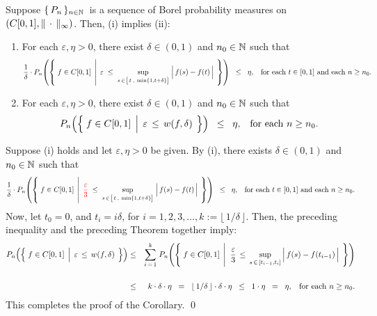 \begin{corollary}
\mbox{}\vskip 0.2cm
\noindent
Suppose $\{\,P_{n}\,\}_{n\in\mathbb{N}}$\, is a sequence of Borel probability measures on $\left(C[0,1],\Vert\,\cdot\,\Vert_{\infty}\right)$.
\vskip 0.1cm
\noindent
Then, (i) implies (ii):
\begin{enumerate}
\item	For each $\varepsilon, \eta > 0$, there exist $\delta \in (0,1)$ and $n_{0} \in \mathbb{N}$ such that
		\begin{equation*}
		\dfrac{1}{\delta}\cdot
		P_{n}\!\left(\left\{\;
			f \in \Czo
			\;\left\vert\;\,
				\varepsilon\;\leq\;\underset{s\,\in\,\left[\,t\,\overset{{\color{white}1}}{,}\,\min\{1,t+\delta\}\right]}{\sup}
				\,\left\vert\,f(s) \overset{{\color{white}.}}{-} f(t)\,\right\vert
			\right.
		\;\right\}\right)
		\;\;\leq\;\; \eta,
		\;\;\;
		\textnormal{for each $t \in [0,1]$ and each $n \geq n_{0}$}.
		\end{equation*}
\item	For each $\varepsilon, \eta > 0$, there exist $\delta \in (0,1)$ and $n_{0} \in \mathbb{N}$ such that
		\begin{equation*}
		P_{n}\!\left(\left\{\;f\in\Czo\;\left\vert\;\, \varepsilon \,\leq\, \overset{{\color{white}1}}{w}(f,\delta)\right.\;\right\}\right)
		\;\;\leq\;\; \eta,
		\;\;\;
		\textnormal{for each $n \geq n_{0}$}.
		\end{equation*}
\end{enumerate}
\end{corollary}
\proof
Suppose (i) holds and let $\varepsilon, \eta > 0$ be given.
By (i), there exists $\delta \in (0,1)$ and $n_{0} \in \mathbb{N}$ such that
\begin{equation*}
\dfrac{1}{\delta}\cdot
P_{n}\!\left(\left\{\;
	f \in \Czo
	\;\left\vert\;\,
		{\color{red}\dfrac{\varepsilon}{3}}
		\;\leq\;
		\underset{s\,\in\,\left[\,t\,\overset{{\color{white}1}}{,}\,\min\{1,t+\delta\}\right]}{\sup}
		\,\left\vert\,f(s) \overset{{\color{white}.}}{-} f(t)\,\right\vert
	\right.
\;\right\}\right)
\;\;\leq\;\; \eta,
\;\;\;
\textnormal{for each $t \in [0,1]$ and each $n \geq n_{0}$}.
\end{equation*}
Now, let $t_{0} = 0$, and $t_{i} = i\delta$, for $i = 1, 2, 3, \ldots, k := \lfloor\,1/\delta\,\rfloor$.
Then, the preceding inequality and the preceding Theorem together imply:
\begin{eqnarray*}
P_{n}\!\left(\left\{\;f\in\Czo\;\left\vert\;\,\varepsilon\,\leq\,\overset{{\color{white}1}}{w}(f,\delta)\right.\;\right\}\right)
&\leq&
	\overset{k}{\underset{i\,=\,1}{\sum}}\;
	P_{n}\!\left(\left\{\; f\in\Czo \;\left\vert\;\;
		\dfrac{\varepsilon}{3}
		\,\leq\,
		\underset{s\,\in\,[t_{i-1},t_{i}]}{\sup}
		\left\vert\,f(s) \overset{{\color{white}.}}{-} f(t_{i-1})\,\right\vert
		\right.\;\right\}\right)
\\ \\
&\leq&
	k\cdot\delta\cdot\eta
	\;\; = \;\; \lfloor\,1/\delta\,\rfloor \cdot \delta \cdot \eta
	\;\; \leq \;\; 1 \cdot \eta
	\;\; = \;\; \eta,
	\;\;\;\textnormal{for each $n \geq n_{0}$}.
\end{eqnarray*}
This completes the proof of the Corollary.
\qed

